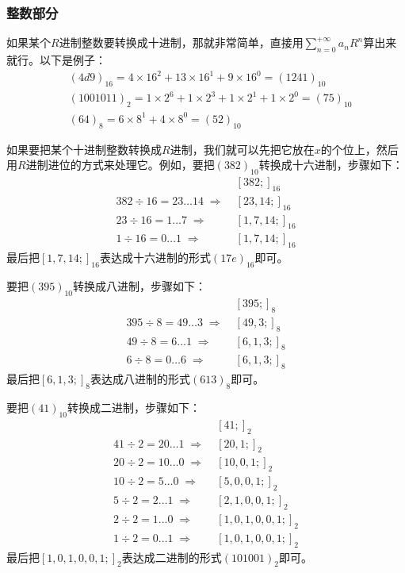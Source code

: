 \subsubsection*{整数部分}
如果某个$R$进制整数要转换成十进制，那就非常简单，直接用$\sum_{n=0}^{+\infty}a_nR^n$算出来就行。以下是例子：
\begin{align*}
&(4d9)_{16}=4\times16^2+13\times16^1+9\times16^0=(1241)_{10}\\
&(1001011)_2=1\times2^6+1\times2^3+1\times2^1+1\times2^0=(75)_{10}\\
&(64)_8=6\times8^1+4\times8^0=(52)_{10}
\end{align*}\par
如果要把某个十进制整数转换成$R$进制，我们就可以先把它放在$x$的个位上，然后用$R$进制进位的方式来处理它。例如，要把$(382)_{10}$转换成十六进制，步骤如下：
\begin{align*}
{}&[382;]_{16}\\
382\div16=23\ldots14\;\Rightarrow\;{}&[23,14;]_{16}\\
23\div16=1\ldots7\;\Rightarrow\;{}&[1,7,14;]_{16}\\
1\div16=0\ldots1\;\Rightarrow\;{}&[1,7,14;]_{16}
\end{align*}
最后把$[1,7,14;]_{16}$表达成十六进制的形式$(17e)_{16}$即可。\par
要把$(395)_{10}$转换成八进制，步骤如下：
\begin{align*}
{}&[395;]_8\\
395\div8=49\ldots3\;\Rightarrow\;{}&[49,3;]_8\\
49\div8=6\ldots1\;\Rightarrow\;{}&[6,1,3;]_8\\
6\div8=0\ldots6\;\Rightarrow\;{}&[6,1,3;]_8
\end{align*}
最后把$[6,1,3;]_8$表达成八进制的形式$(613)_8$即可。\par
要把$(41)_{10}$转换成二进制，步骤如下：
\begin{align*}
{}&[41;]_2\\
41\div2=20\ldots1\;\Rightarrow\;{}&[20,1;]_2\\
20\div2=10\ldots0\;\Rightarrow\;{}&[10,0,1;]_2\\
10\div2=5\ldots0\;\Rightarrow\;{}&[5,0,0,1;]_2\\
5\div2=2\ldots1\;\Rightarrow\;{}&[2,1,0,0,1;]_2\\
2\div2=1\ldots0\;\Rightarrow\;{}&[1,0,1,0,0,1;]_2\\
1\div2=0\ldots1\;\Rightarrow\;{}&[1,0,1,0,0,1;]_2
\end{align*}
最后把$[1,0,1,0,0,1;]_2$表达成二进制的形式$(101001)_2$即可。\par
